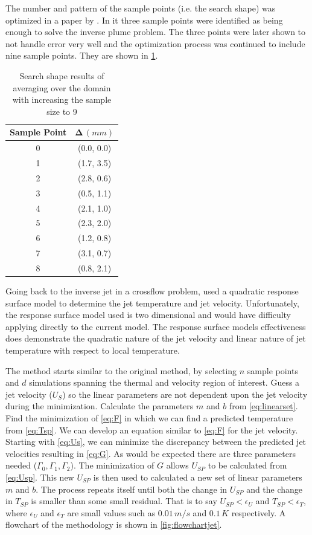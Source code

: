 \documentclass[preprint,12pt]{elsarticle}
\newcommand{\bv}[1]{\boldsymbol #1}  %
\begin{document}
The number and pattern of the sample points (i.e. the search shape) was optimized in a paper by \citet{ijhmt2}.  In it three sample points were identified as being enough to solve the inverse plume problem.  The three points were later shown to not handle error very well and the optimization process was continued to include nine sample points.  They are shown in \cref{tab:expoptresults}.
\begin{table}[!h!t!b!p]
\begin{center}
\begin{tabular}{ c c }
\hline
 Sample Point & $\bv{\Delta} \, (mm)$  \\ \hline 
0 & (0.0, 0.0) \\
1 & (1.7, 3.5) \\
2 & (2.8, 0.6) \\  
3 & (0.5, 1.1) \\
4 & (2.1, 1.0) \\ 
5 & (2.3, 2.0) \\
6 & (1.2, 0.8) \\
7 & (3.1, 0.7) \\
8 & (0.8, 2.1) \\ \hline
 \end{tabular}
\caption{Search shape results of averaging over the domain with increasing the sample size to 9}
\label{tab:expoptresults}
\end{center}
\end{table}

Going back to the inverse jet in a crossflow problem, \citet{knight} used a quadratic response surface model to determine the jet temperature and jet velocity.  Unfortunately, the response surface model used is two dimensional and would have difficulty applying directly to the current model.  The response surface models effectiveness does demonstrate the quadratic nature of the jet velocity and linear nature of jet temperature with respect to local temperature.

The method starts similar to the original method, by selecting $n$ sample points and $d$ simulations spanning the thermal and velocity region of interest.  Guess a jet velocity ($U_S$) so the linear parameters are not dependent upon the jet velocity during the minimization.  Calculate the parameters $m$ and $b$ from \cref{eq:linearset}.  Find the minimization of \cref{eq:F} in which we can find a predicted temperature from \cref{eq:Tsp}.  We can develop an equation similar to \cref{eq:F} for the jet velocity.  Starting with \cref{eq:Us}, we can minimize the discrepancy between the predicted jet velocities resulting in \cref{eq:G}.  As would be expected there are three parameters needed ($\Gamma_0,\Gamma_1,\Gamma_2$).  The minimization of $G$ allows $U_{SP}$ to be calculated from \cref{eq:Usp}.  This new $U_{SP}$ is then used to calculated a new set of linear parameters $m$ and $b$.  The process repeats itself until both the change in $U_{SP}$ and the change in $T_{SP}$ is smaller than some small residual.  That is to say $U_{SP}<\epsilon_U$ and $T_{SP}<\epsilon_T$, where $\epsilon_U$ and $\epsilon_T$ are small values such as $0.01\,m/s$ and $0.1\,K$ respectively.  A flowchart of the methodology is shown in \cref{fig:flowchartjet}.
\end{document}

